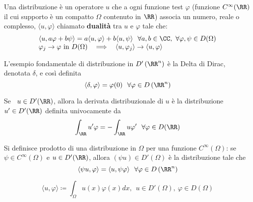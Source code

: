 \begin{defn}
[Distribuzione] Una distribuzione è un operatore $u$ che a ogni funzione test $\varphi $ (funzione $C^{\infty}(\RR)$ il cui supporto è un compatto $\Omega $ contenuto in $\RR $) associa un numero, reale o complesso, $\langle u, \varphi \rangle $ chiamato \textbf{dualità} tra $u$ e $\varphi $ tale che:
\begin{equation*}
\begin{array}{l}
\langle u, a\varphi + b\psi \rangle = a\langle u, \varphi \rangle + b\langle u, \psi \rangle \ \ \forall a, b\in \CC, \ \forall \varphi, \psi \in D(\Omega)\\
\varphi_{j}\rightarrow \varphi \ \text{in} \ D(\Omega) \ \ \implies \ \ \langle u, \varphi_{j} \rangle \rightarrow \langle u, \varphi \rangle
\end{array}
\end{equation*}
\end{defn}
\begin{rem}
 L'esempio fondamentale di distribuzione in $D'\left(\RR^{n}\right)$ è la Delta di Dirac, denotata $\delta $, e così definita
\begin{equation*}
\langle \delta, \varphi \rangle = \varphi (0) \ \ \forall \varphi \in D\left(\RR^{n}\right)
\end{equation*}
\end{rem}
\begin{defn}
Se \ $u\in D'(\RR)$, allora la derivata distribuzionale di $u$ è la distribuzione $u'\in D'(\RR)$ definita univocamente da
\begin{equation*}
\int_{\RR} u'\varphi = - \int_{\RR} u\varphi'\ \ \forall \varphi \in D(\RR)
\end{equation*}
\end{defn}
\begin{defn}
Si definisce prodotto di una distribuzione in $\Omega $ per una funzione $C^{\infty}(\Omega)$: se $\psi \in C^{\infty}(\Omega)$ e $u\in D'(\RR)$, allora $(\psi u) \in D'(\Omega)$ è la distribuzione tale che
\begin{equation*}
\langle \psi u, \varphi \rangle = \langle u, \psi \varphi \rangle \ \ \forall \varphi \in D\left(\RR^{n}\right)
\end{equation*}
\end{defn}
\begin{rem}
\begin{equation*}
\langle u, \varphi \rangle \coloneqq \int_{\Omega} u(x) \varphi (x) dx, \ \ u\in D'(\Omega), \ \varphi \in D(\Omega)
\end{equation*}
\end{rem}


